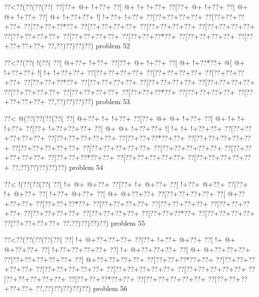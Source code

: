 \vbox{\vbox{\goo
\0??<\0??(\0??(\0??(\0??(
\0??[\0??+\- @+\- !+\0??+
\0??[\- @+\- !+\- !+\0??+
\0??[\0??+\- @+\- !+\0??+
\0??[\- @+\- @+\- !+\0??+
\0??[\- @+\- !+\0??+\0??+
\- ![\- !+\0??+\- !+\0??+
\0??[\0??+\0??+\0??+\0??+
\0??[\0??+\0??+\0??+\0??+
\0??[\0??+\0??+\0??*\0??+
\0??[\0??+\0??+\0??+\0??+
\0??[\0??+\0??+\0??+\0??+
\0??[\0??+\0??+\0??+\0??+
\0??[\0??+\0??+\0??+\0??+
\0??[\0??+\0??+\0??+\0??+
\0??[\0??+\0??+\0??*\0??+
\0??[\0??+\0??+\0??+\0??+
\0??[\0??+\0??+\0??+\0??+
\0??,\0??)\0??)\0??)\0??)
}
\hfil problem 52\hfil\break
}

\vbox{\vbox{\goo
\0??<\0??(\0??(\- !(\0??(
\0??[\- @+\0??+\- !+\0??+
\0??[\0??+\- @+\- !+\0??+
\0??[\- @+\- !+\0??*\0??+
\- @[\- @+\- !+\0??+\0??+
\- ![\- !+\- !+\0??+\0??+
\0??[\0??+\0??+\0??+\0??+
\0??[\0??+\0??+\0??+\0??+
\0??[\0??+\0??+\0??+\0??+
\0??[\0??+\0??+\0??*\0??+
\0??[\0??+\0??+\0??+\0??+
\0??[\0??+\0??+\0??+\0??+
\0??[\0??+\0??+\0??+\0??+
\0??[\0??+\0??+\0??+\0??+
\0??[\0??+\0??+\0??+\0??+
\0??[\0??+\0??+\0??*\0??+
\0??[\0??+\0??+\0??+\0??+
\0??[\0??+\0??+\0??+\0??+
\0??,\0??)\0??)\0??)\0??)
}
\hfil problem 53\hfil\break
}

\vbox{\vbox{\goo
\0??<\- @(\0??(\0??(\0??(\0??(
\0??[\- @+\0??+\- !+\- !+\0??+
\0??[\0??+\- @+\- @+\- !+\0??+
\0??[\- @+\- !+\- !+\- !+\0??+
\0??[\0??+\- !+\0??+\0??+\0??+
\0??[\- @+\- @+\- !+\0??+\0??+
\- ![\- !+\- !+\- !+\0??+\0??+
\0??[\0??+\0??+\0??+\0??+\0??+
\0??[\0??+\0??+\0??+\0??+\0??+
\0??[\0??+\0??+\0??*\0??+\0??+
\0??[\0??+\0??+\0??+\0??+\0??+
\0??[\0??+\0??+\0??+\0??+\0??+
\0??[\0??+\0??+\0??+\0??+\0??+
\0??[\0??+\0??+\0??+\0??+\0??+
\0??[\0??+\0??+\0??+\0??+\0??+
\0??[\0??+\0??+\0??*\0??+\0??+
\0??[\0??+\0??+\0??+\0??+\0??+
\0??[\0??+\0??+\0??+\0??+\0??+
\0??,\0??)\0??)\0??)\0??)\0??)
}
\hfil problem 54\hfil\break
}

\vbox{\vbox{\goo
\0??<\- !(\0??(\0??(\0??(
\0??[\- !+\- @+\- @+\0??+
\0??[\0??+\- !+\- @+\0??+
\0??[\- !+\0??+\- @+\0??+
\0??[\0??+\- !+\- @+\0??+
\0??[\- !+\0??+\- @+\0??+
\0??[\- @+\- @+\0??+\0??+
\0??[\0??+\0??+\0??+\0??+
\0??[\- @+\0??+\0??+\0??+
\0??[\0??+\0??+\0??*\0??+
\0??[\0??+\0??+\0??+\0??+
\0??[\0??+\0??+\0??+\0??+
\0??[\0??+\0??+\0??+\0??+
\0??[\0??+\0??+\0??+\0??+
\0??[\0??+\0??+\0??+\0??+
\0??[\0??+\0??+\0??*\0??+
\0??[\0??+\0??+\0??+\0??+
\0??[\0??+\0??+\0??+\0??+
\0??,\0??)\0??)\0??)\0??)
}
\hfil problem 55\hfil\break
}

\vbox{\vbox{\goo
\0??<\0??(\0??(\0??(\0??(\0??(
\0??[\- !+\- @+\0??+\0??+\0??+
\0??[\0??+\- !+\0??+\- @+\0??+
\0??[\- !+\- @+\- @+\0??+\0??+
\0??[\- !+\0??+\0??+\0??+\0??+
\0??[\- !+\- @+\0??+\0??+\0??+
\0??[\- @+\- @+\0??+\0??+\0??+
\0??[\0??+\0??+\0??+\0??+\0??+
\0??[\- @+\0??+\0??+\0??+\0??+
\0??[\0??+\0??+\0??*\0??+\0??+
\0??[\0??+\0??+\0??+\0??+\0??+
\0??[\0??+\0??+\0??+\0??+\0??+
\0??[\0??+\0??+\0??+\0??+\0??+
\0??[\0??+\0??+\0??+\0??+\0??+
\0??[\0??+\0??+\0??+\0??+\0??+
\0??[\0??+\0??+\0??*\0??+\0??+
\0??[\0??+\0??+\0??+\0??+\0??+
\0??[\0??+\0??+\0??+\0??+\0??+
\0??,\0??)\0??)\0??)\0??)\0??)
}
\hfil problem 56\hfil\break
}

